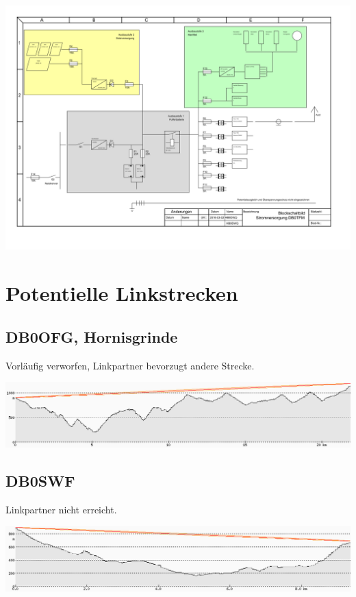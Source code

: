 \documentclass[a4paper]{scrartcl}
\begin{document}
\includegraphics[height=\linewidth, angle=90]{Bilder/Blockschaltbild_Stromversorgung.png}

\section{Potentielle Linkstrecken}
\subsection{DB0OFG, Hornisgrinde}
Vorl\"aufig verworfen, Linkpartner bevorzugt andere Strecke.

\includegraphics[width=\linewidth]{Bilder/Profil_DB0OFG.png}

\subsection{DB0SWF}
Linkpartner nicht erreicht.

\includegraphics[width=\linewidth]{Bilder/Profil_DB0SWF}
\end{document}
